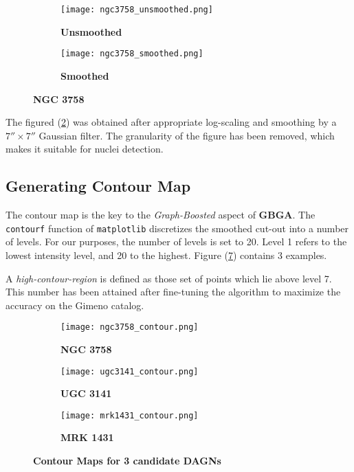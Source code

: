 \documentclass[12pt]{article}
\begin{document}
\bigskip

\begin{figure}[!htb]
    \begin{subfigure}[h]{0.32\textwidth}
        \texttt{[image: ngc3758\_unsmoothed.png]}
        \caption{\textbf{Unsmoothed}}
        \label{fig:ngc3758_unsmoothed}
    \end{subfigure}
    \hfill
    \begin{subfigure}[h]{0.32\textwidth}
        \texttt{[image: ngc3758\_smoothed.png]}
        \caption{\textbf{Smoothed}}
        \label{fig:ngc3758_smoothed}
    \end{subfigure}
    
    \caption{\textbf{NGC 3758}}
    \label{fig:ngc3758}
\end{figure}

The figured (\ref{fig:ngc3758_smoothed}) was obtained after appropriate log-scaling and smoothing by a $7'' \times 7''$ Gaussian filter. The granularity of the figure has been removed, which makes it suitable for nuclei detection.

\subsection{Generating Contour Map}

The contour map is the key to the \textit{Graph-Boosted} aspect of \textbf{GBGA}. The \texttt{contourf} function of \texttt{matplotlib} discretizes the smoothed cut-out into a number of levels. For our purposes, the number of levels is set to 20. Level 1 refers to the lowest intensity level, and 20 to the highest. Figure (\ref{fig:contour_map}) contains 3 examples.

\bigskip

A \textit{high-contour-region} is defined as those set of points which lie above level 7. This number has been attained after fine-tuning the algorithm to maximize the accuracy on the Gimeno \cite{gimeno} catalog.

\begin{figure}[!htb]
    \begin{subfigure}[h]{0.32\textwidth}
        \texttt{[image: ngc3758\_contour.png]}
        \caption{\textbf{NGC 3758}}
        \label{fig:ngc3758_contour}
    \end{subfigure}
    \hfill
    \begin{subfigure}[h]{0.32\textwidth}
        \texttt{[image: ugc3141\_contour.png]}
        \caption{\textbf{UGC 3141}}
        \label{fig:ugc3141_contour}
    \end{subfigure}
    \hfill
    \begin{subfigure}[h]{0.32\textwidth}
        \texttt{[image: mrk1431\_contour.png]}
        \caption{\textbf{MRK 1431}}
        \label{fig:mrk1431_contour}
    \end{subfigure}
    
    \caption{\textbf{Contour Maps for 3 candidate DAGNs}}
    \label{fig:contour_map}
\end{figure}
\end{document}
